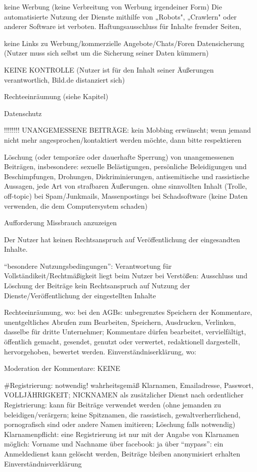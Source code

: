 	keine Werbung (keine Verbreitung von Werbung irgendeiner Form)
	Die automatisierte Nutzung der Dienste mithilfe von „Robots", „Crawlern" oder anderer Software ist verboten.
	Haftungsausschluss für Inhalte fremder Seiten, 
	
	
	keine Links zu Werbung/kommerzielle Angebote/Chats/Foren
	Datensicherung (Nutzer muss sich selbst um die Sicherung seiner Daten kümmern)
	
	KEINE KONTROLLE (Nutzer ist für den Inhalt seiner Äußerungen verantwortlich, Bild.de distanziert sich)
	
	Rechteeinräumung (siehe Kapitel)
	
	Datenschutz
	
	
!!!!!!!!	UNANGEMESSENE BEITRÄGE:
	kein Mobbing erwünscht; wenn jemand nicht mehr angesprochen/kontaktiert werden möchte, dann bitte respektieren
	
	Löschung (oder temporäre oder dauerhafte Sperrung) von unangemessenen Beiträgen, insbesondere:     
	sexuelle Belästigungen, 
	persönliche Beleidigungen und Beschimpfungen,
    	Drohungen,
    	Diskriminierungen,
    	antisemitische und rassistische Aussagen,
    	jede Art von strafbaren Äußerungen.
	ohne sinnvollten Inhalt (Trolle, off-topic)
	bei Spam/Junkmails, Massenpostings
	bei Schadsoftware (keine Daten verwenden, die dem Computersystem schaden)
	
	Aufforderung Missbrauch anzuzeigen
	
	Der Nutzer hat keinen Rechtsanspruch auf Veröffentlichung der eingesandten Inhalte.

	
	
	
	``besondere Nutzungsbedingungen'':
			Verantwortung für Vollständikeit/Rechtmäßigkeit liegt beim Nutzer
			bei Verstößen: Ausschluss und Löschung der Beiträge
			kein Rechtsanspruch auf Nutzung der Dienste/Veröffentlichung der eingestellten Inhalte
			
			
			
			
	Rechteeinräumung, wo: bei den AGBs: 
	unbegrenztes Speichern der Kommentare, unentgeltliches Abrufen zum Bearbeiten, Speichern, Ausdrucken, Verlinken, dasselbe für dritte Unternehmer; 			Kommentare dürfen bearbeitet, vervielfältigt, öffentlich gemacht, gesendet, genutzt oder verwertet, redaktionell dargestellt, hervorgehoben, bewertet werden.
	Einverständniserklärung, wo:
	
Moderation der Kommentare: KEINE




#Registrierung:  notwendig! wahrheitsgemäß Klarnamen, Emailadresse, Passwort, VOLLJÄHRIGKEIT; NICKNAMEN als zusätzlicher Dienst nach ordentlicher Registrierung: kann für Beiträge verwendet werden (ohne jemanden zu beleidigen/verärgern; keine Spitznamen, die rassistisch, gewaltverherrlichend, pornografisch sind oder andere Namen imitieren; Löschung falls notwendig)
	 Klarnamenpflicht: eine Registrierung ist nur mit der Angabe von Klarnamen möglich: Vorname und Nachname
	 über facebook: ja
	 über ``mypass'': ein Anmeldedienst 	
	 kann gelöscht werden, Beiträge bleiben anonymisiert erhalten
	 Einverständnisverklärung
	 


